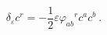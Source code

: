 \begin{equation}
\delta_{\varepsilon} c^{r} = -\frac{1}{2} \varepsilon {\varphi_{ab}}^r c^a c^b~.            \label{eq:byuzyirmibes}    
\end{equation}

